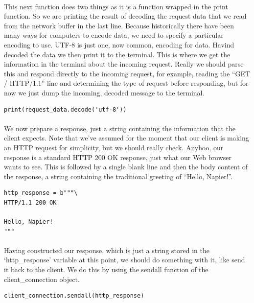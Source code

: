 \paragraph{} This next function does two things as it is a function wrapped in the print function. So we are printing the result of decoding the request data that we read from the network buffer in the last line. Because historically there have been many ways for computers to encode data, we need to specify a particular encoding to use. UTF-8 is just one, now common, encoding for data. Havind decoded the data we then print it to the terminal. This is where we get the information in the terminal about the incoming request. Really we should parse this and respond directly to the incoming request, for example, reading the ``GET / HTTP/1.1'' line and determining the type of request before responding, but for now we just dump the incoming, decoded message to the terminal.

\begin{lstlisting}[style=CODE]
print(request_data.decode('utf-8'))
\end{lstlisting}

\paragraph{} We now prepare a response, just a string containing the information that the client expects. Note that we've assumed for the moment that our client is making an HTTP request for simplicity, but we should really check. Anyhoo, our response is a standard HTTP 200 OK response, just what our Web browser wants to see. This is followed by a single blank line and then the body content of the response, a string containing the traditional greeting of ``Hello, Napier!''.

\begin{lstlisting}[style=CODE]
http_response = b"""\
HTTP/1.1 200 OK

Hello, Napier!
"""
\end{lstlisting}

\paragraph{} Having constructed our response, which is just a string stored in the `http\_response' variable at this point, we should do something with it, like send it back to the client. We do this by using the sendall function of the client\_connection object.

\begin{lstlisting}[style=CODE]
client_connection.sendall(http_response)
\end{lstlisting}

